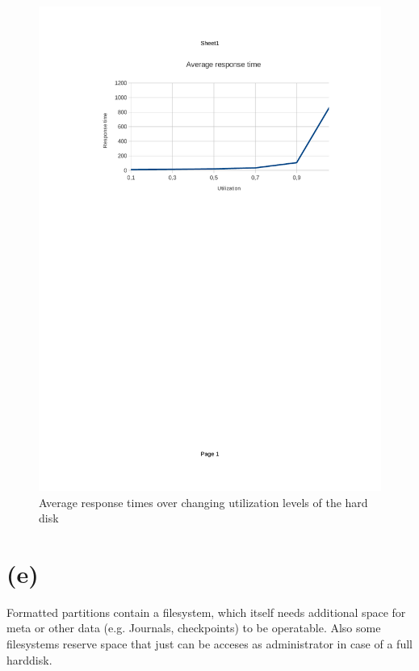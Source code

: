 \documentclass{article}
\begin{document}
\begin{figure}
	\begin{center}
	\includegraphics[width=\textwidth]{plot.pdf}
	\caption{Average response times over changing utilization levels of the hard disk}
	\label{fig:responsetime}
	\end{center}
\end{figure}



\section*{(e)}
Formatted partitions contain a filesystem, which itself needs additional space for meta or other data (e.g. Journals, checkpoints) to be operatable. Also some filesystems reserve space that just can be acceses as administrator in case of a full harddisk.
\end{document}

